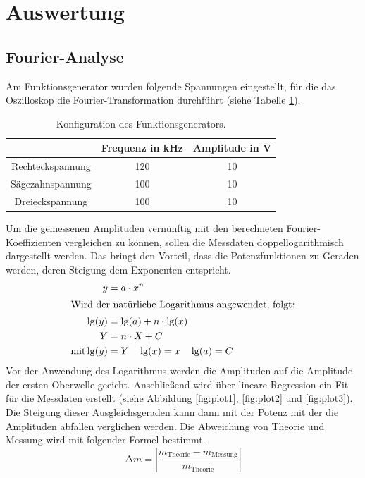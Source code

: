 \section{Auswertung}
\label{sec:Auswertung}

\subsection{Fourier-Analyse}
\label{sec:Auswertung_Analyse}

Am Funktionsgenerator wurden folgende Spannungen eingestellt, für die das Oszilloskop die Fourier-Transformation durchführt (siehe Tabelle \ref{tab:Generator}).
\begin{table}
  \centering
  \caption{Konfiguration des Funktionsgenerators.}
  \label{tab:Generator}
  \begin{tabular}{c c c}
    \toprule
    & Frequenz in kHz & Amplitude in V \\
    \midrule
    Rechteckspannung & 120 & 10 \\
    Sägezahnspannung & 100 & 10 \\
    Dreieckspannung & 100 & 10 \\
    \bottomrule
  \end{tabular}
\end{table}
Um die gemessenen Amplituden vernünftig mit den berechneten Fourier-Koeffizienten vergleichen zu können, sollen die Messdaten doppellogarithmisch dargestellt werden.
Das bringt den Vorteil, dass die Potenzfunktionen zu Geraden werden, deren Steigung dem Exponenten entspricht.
\begin{align*}
   y &= a \cdot x^n \\
   \intertext{Wird der natürliche Logarithmus angewendet, folgt:}
   \lg(y) &= \lg(a) + n \cdot \lg(x) \\
   Y &= n \cdot X + C \\
   \text{mit} \lg(y) &= Y \quad \lg(x) = x \quad \lg(a) = C
\end{align*}
Vor der Anwendung des Logarithmus werden die Amplituden auf die Amplitude der ersten Oberwelle geeicht.
Anschließend wird über lineare Regression ein Fit für die Messdaten erstellt (siehe Abbildung \ref{fig:plot1}, \ref{fig:plot2} und \ref{fig:plot3}).
Die Steigung dieser Ausgleichsgeraden kann dann mit der Potenz mit der die Amplituden abfallen verglichen werden.
Die Abweichung von Theorie und Messung wird mit folgender Formel bestimmt.
\begin{equation}
  \increment m = \left \lvert \frac{m_{\text{Theorie}} - m_{\text{Messung}}}{m_{\text{Theorie}}} \right \rvert
\end{equation}
